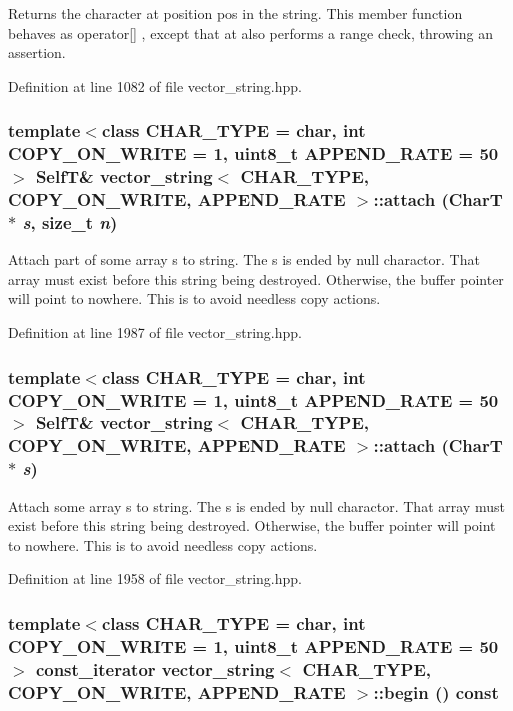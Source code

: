 Returns the character at position pos in the string. This member function behaves as operator\mbox{[}\mbox{]} , except that at also performs a range check, throwing an assertion. 

Definition at line 1082 of file vector\_\-string.hpp.\hypertarget{classvector__string_2be6a4b71a784962fc9c8b619cf210d6}{
\subsubsection[{attach}]{\setlength{\rightskip}{0pt plus 5cm}template$<$class CHAR\_\-TYPE  = char, int COPY\_\-ON\_\-WRITE = 1, uint8\_\-t APPEND\_\-RATE = 50$>$ {\bf SelfT}\& {\bf vector\_\-string}$<$ CHAR\_\-TYPE, COPY\_\-ON\_\-WRITE, APPEND\_\-RATE $>$::attach (CharT $\ast$ {\em s}, \/  size\_\-t {\em n})}}
\label{classvector__string_2be6a4b71a784962fc9c8b619cf210d6}


Attach part of some array s to string. The s is ended by null charactor. That array must exist before this string being destroyed. Otherwise, the buffer pointer will point to nowhere. This is to avoid needless copy actions. 

Definition at line 1987 of file vector\_\-string.hpp.\hypertarget{classvector__string_f0a88c736a417b3ba61ac3b5231b0fa7}{
\subsubsection[{attach}]{\setlength{\rightskip}{0pt plus 5cm}template$<$class CHAR\_\-TYPE  = char, int COPY\_\-ON\_\-WRITE = 1, uint8\_\-t APPEND\_\-RATE = 50$>$ {\bf SelfT}\& {\bf vector\_\-string}$<$ CHAR\_\-TYPE, COPY\_\-ON\_\-WRITE, APPEND\_\-RATE $>$::attach (CharT $\ast$ {\em s})}}
\label{classvector__string_f0a88c736a417b3ba61ac3b5231b0fa7}


Attach some array s to string. The s is ended by null charactor. That array must exist before this string being destroyed. Otherwise, the buffer pointer will point to nowhere. This is to avoid needless copy actions. 

Definition at line 1958 of file vector\_\-string.hpp.\hypertarget{classvector__string_8e6b66cfacb75c8ae4990096c841a812}{
\subsubsection[{begin}]{\setlength{\rightskip}{0pt plus 5cm}template$<$class CHAR\_\-TYPE  = char, int COPY\_\-ON\_\-WRITE = 1, uint8\_\-t APPEND\_\-RATE = 50$>$ const\_\-iterator {\bf vector\_\-string}$<$ CHAR\_\-TYPE, COPY\_\-ON\_\-WRITE, APPEND\_\-RATE $>$::begin () const}}
\label{classvector__string_8e6b66cfacb75c8ae4990096c841a812}


